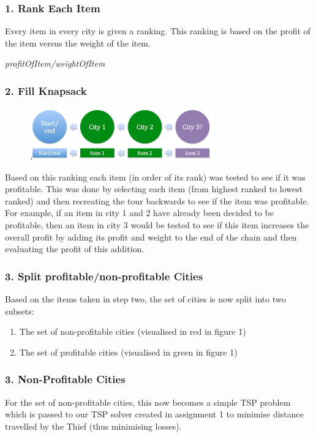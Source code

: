 \documentclass[a4paper,12pt]{article}
\begin{document}
\subsubsection*{1. Rank Each Item}
Every item in every city is given a ranking. This ranking is based on the profit of the item versus the weight of the item.
\begin{center}
\emph{profitOfItem/weightOfItem}
\end{center}

\subsubsection*{2. Fill Knapsack}
\begin{figure}[h]
\centering
\includegraphics[width=80mm]{AddItem.png}
\end{figure}
Based on this ranking each item (in order of its rank) was tested to see if it was profitable. This was done by selecting each item (from highest ranked to lowest ranked) and then recreating the tour backwards to see if the item was profitable. For example, if an item in city 1 and 2 have already been decided to be profitable, then an item in city 3 would be tested to see if this item increases the overall profit by adding its profit and weight to the end of the chain and then evaluating the profit of this addition.

\subsubsection*{3. Split profitable/non-profitable Cities}
Based on the items taken in step two, the set of cities is now split into two subsets:

\begin{enumerate}
\item The set of non-profitable cities (visualised in red in figure 1)
\item The set of profitable cities (visualised in green in figure 1)
\end{enumerate}

\subsubsection*{3. Non-Profitable Cities}
For the set of non-profitable cities, this now becomes a simple TSP problem which is passed to our TSP solver created in assignment 1 to minimise distance travelled by the Thief (thus minimising losses).
\end{document}

